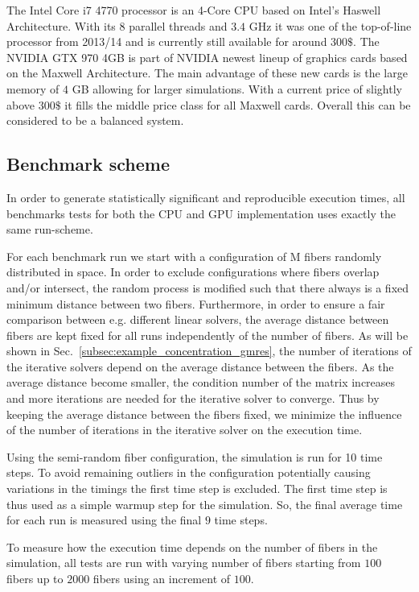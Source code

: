 The Intel Core i7 4770 processor is an 4-Core CPU based on Intel's Haswell Architecture. With its 8 parallel threads and $3.4$ GHz it was one of the top-of-line processor from 2013/14 and is currently still available for around $300\$$. The NVIDIA GTX 970 4GB is part of NVIDIA newest lineup of graphics cards based on the Maxwell Architecture. The main advantage of these new cards is the large memory of $4$ GB allowing for larger simulations. With a current price of slightly above $300\$$ it fills the middle price class for all Maxwell cards. Overall this can be considered to be a balanced system.

\subsection{Benchmark scheme}
\label{subsec:benchmark_scheme}

In order to generate statistically significant and reproducible execution times, all benchmarks tests for both the CPU and GPU implementation uses exactly the same run-scheme.

For each benchmark run we start with a configuration of M fibers randomly distributed in space. In order to exclude configurations where fibers overlap and/or intersect, the random process is modified such that there always is a fixed minimum distance between two fibers. Furthermore, in order to ensure a fair comparison between e.g. different linear solvers, the average distance between fibers are kept fixed for all runs independently of the number of fibers. As will be shown in Sec.~\ref{subsec:example_concentration_gmres}, the number of iterations of the iterative solvers depend on the average distance between the fibers. As the average distance become smaller, the condition number of the matrix increases and more iterations are needed for the iterative solver to converge. Thus by keeping the average distance between the fibers fixed, we minimize the influence of the number of iterations in the iterative solver on the execution time.

Using the semi-random fiber configuration, the simulation is run for 10 time steps. To avoid remaining outliers in the configuration potentially causing variations in the timings the first time step is excluded. The first time step is thus used as a simple warmup step for the simulation. So, the final average time for each run is measured using the final $9$ time steps.

To measure how the execution time depends on the number of fibers in the simulation, all tests are run with varying number of fibers starting from $100$ fibers up to $2000$ fibers using an increment of $100$.

